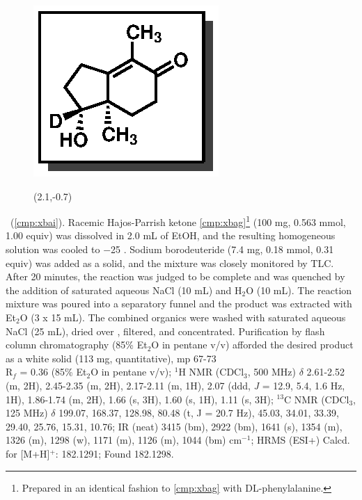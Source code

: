 \pagebreak
\begin{figure}
  \vspace{-12pt}
  \begin{center}
    \includegraphics[scale=0.8]{chp_singlecarbon/images/xbai}
    \begin{textblock}{1}(2.1,-0.7)  \end{textblock}
  \end{center}
  \vspace{-30pt}
\end{figure}\noindent \textbf{\CMPxbai}\ (\ref{cmp:xbai}). Racemic Hajos-Parrish
ketone \ref{cmp:xbag}\footnote{Prepared in an identical fashion to \ref{cmp:xbag} with
DL-phenylalanine.} (100 mg, 0.563 mmol, 1.00 equiv) was dissolved in 2.0 mL of EtOH, and the
resulting homogeneous solution was cooled to $-$25 \degc. Sodium borodeuteride (7.4 mg, 0.18 mmol, 0.31 equiv) was added as a solid, and the
mixture was closely monitored by TLC. After 20 minutes, the reaction was judged to be
complete and was quenched by the addition of saturated aqueous NaCl (10 mL) and H$_2$O (10
mL). The reaction mixture was poured into a separatory funnel and the product was extracted
with Et$_2$O (3 x 15 mL). The combined organics were washed with saturated aqueous NaCl (25
mL), dried over , filtered, and concentrated. Purification by flash column chromatography
(85\% Et$_2$O in pentane v/v) afforded the desired product as a white solid (113 mg, quantitative),
mp 67-73 \degc \\
R$_f$ = 0.36 (85\% Et$_2$O in pentane v/v); $^1$H NMR (CDCl$_3$, 500 MHz) $\delta$ 2.61-2.52 (m,
2H), 2.45-2.35 (m, 2H), 2.17-2.11 (m, 1H), 2.07 (ddd, \textit{J} = 12.9, 5.4, 1.6 Hz, 1H), 1.86-1.74 (m, 2H), 1.66 (s, 3H), 1.60 (s, 1H), 1.11 (s, 3H); $^{13}$C NMR (CDCl$_3$, 125 MHz) $\delta$ 199.07, 168.37, 128.98, 80.48 (t, J =
20.7 Hz), 45.03, 34.01, 33.39, 29.40, 25.76, 15.31, 10.76; IR (neat) 3415 (bm), 2922 (bm), 1641
(s), 1354 (m), 1326 (m), 1298 (w), 1171 (m), 1126 (m), 1044 (bm) cm$^{-1}$; HRMS (ESI+) Calcd. for  [M+H]$^+$: 182.1291; Found 182.1298.

